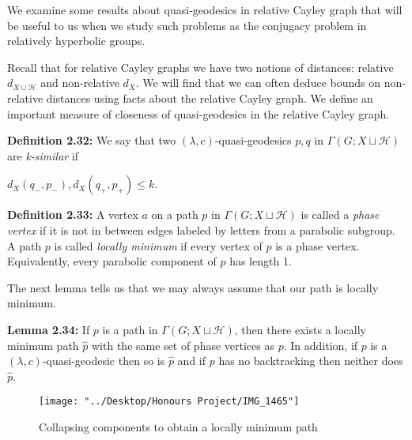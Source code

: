 \documentclass[12pt]{article}
\newcommand{\vs}{\vskip10pt}
\begin{document}
	\vs
	
	We examine some results about quasi-geodesics in relative Cayley graph that will be useful to us when we study such problems as the conjugacy problem in relatively hyperbolic groups. 
	
	\vs 
	
	Recall that for relative Cayley graphs we have two notions of distances: relative $d_{X \cup \mathcal{H}}$ and non-relative $d_X$. We will find that we can often deduce bounds on non-relative distances using facts about the relative Cayley graph. We define an important measure of closeness of quasi-geodesics in the relative Cayley graph. 
	
	\vs
	
	\textbf{Definition 2.32: } We say that two $(\lambda, c)$-quasi-geodesics $p, q$ in $\Gamma(G; X \sqcup \mathcal{H})$ are \textit{k-similar} if 
	
	\vskip1pt $d_X(q_{-}, p_{-}), d_X(q_{+}, p_{+}) \leq k$. 
	
	\vs 
	
	\textbf{Definition 2.33: } A vertex $a$ on a path $p$  in $\Gamma(G; X \sqcup \mathcal{H})$ is called a \textit{phase vertex} if it is not in between edges labeled by letters from a parabolic subgroup. A path $p$ is called \textit{locally minimum} if every vertex of $p$ is a phase vertex. Equivalently, every parabolic component of $p$ has length 1. 
	
	\vs 
	
	The next lemma tells us that we may always assume that our path is locally minimum. 
	
	\vs 
	
	\textbf{Lemma 2.34: } If $p$ is a path in $\Gamma(G;X \sqcup \mathcal{H})$, then there exists a locally minimum path $\hat{p}$ with the same set of phase vertices as $p$. In addition, if $p$ is a $(\lambda, c)$-quasi-geodesic then so is $\hat{p}$ and if $p$ has no backtracking then neither does $\hat{p}$.
	
\begin{figure} [H]
	\centering
	\texttt{[image: "../Desktop/Honours Project/IMG\_1465"]}
	\caption{Collapsing components to obtain a locally minimum path}
	\label{fig:img1465}
\end{figure}
	
\end{document}
